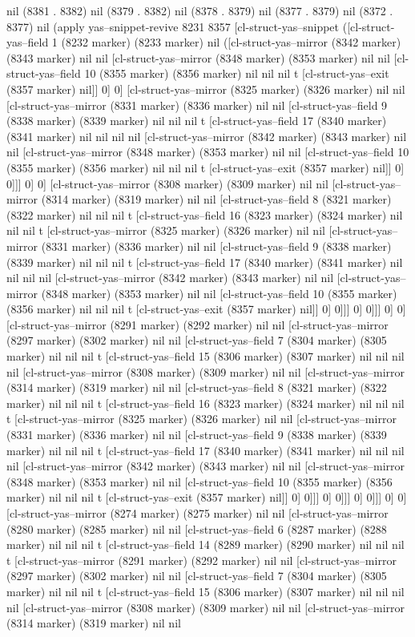 {{nil (8381 . 8382) nil (8379 . 8382) nil (8378 . 8379) nil (8377 . 8379) nil (8372 . 8377) nil (apply yas--snippet-revive 8231 8357 [cl-struct-yas--snippet ([cl-struct-yas--field 1 (8232 marker) (8233 marker) nil ([cl-struct-yas--mirror (8342 marker) (8343 marker) nil nil [cl-struct-yas--mirror (8348 marker) (8353 marker) nil nil [cl-struct-yas--field 10 (8355 marker) (8356 marker) nil nil nil t [cl-struct-yas--exit (8357 marker) nil]] 0] 0] [cl-struct-yas--mirror (8325 marker) (8326 marker) nil nil [cl-struct-yas--mirror (8331 marker) (8336 marker) nil nil [cl-struct-yas--field 9 (8338 marker) (8339 marker) nil nil nil t [cl-struct-yas--field 17 (8340 marker) (8341 marker) nil nil nil nil [cl-struct-yas--mirror (8342 marker) (8343 marker) nil nil [cl-struct-yas--mirror (8348 marker) (8353 marker) nil nil [cl-struct-yas--field 10 (8355 marker) (8356 marker) nil nil nil t [cl-struct-yas--exit (8357 marker) nil]] 0] 0]]] 0] 0] [cl-struct-yas--mirror (8308 marker) (8309 marker) nil nil [cl-struct-yas--mirror (8314 marker) (8319 marker) nil nil [cl-struct-yas--field 8 (8321 marker) (8322 marker) nil nil nil t [cl-struct-yas--field 16 (8323 marker) (8324 marker) nil nil nil t [cl-struct-yas--mirror (8325 marker) (8326 marker) nil nil [cl-struct-yas--mirror (8331 marker) (8336 marker) nil nil [cl-struct-yas--field 9 (8338 marker) (8339 marker) nil nil nil t [cl-struct-yas--field 17 (8340 marker) (8341 marker) nil nil nil nil [cl-struct-yas--mirror (8342 marker) (8343 marker) nil nil [cl-struct-yas--mirror (8348 marker) (8353 marker) nil nil [cl-struct-yas--field 10 (8355 marker) (8356 marker) nil nil nil t [cl-struct-yas--exit (8357 marker) nil]] 0] 0]]] 0] 0]]] 0] 0] [cl-struct-yas--mirror (8291 marker) (8292 marker) nil nil [cl-struct-yas--mirror (8297 marker) (8302 marker) nil nil [cl-struct-yas--field 7 (8304 marker) (8305 marker) nil nil nil t [cl-struct-yas--field 15 (8306 marker) (8307 marker) nil nil nil nil [cl-struct-yas--mirror (8308 marker) (8309 marker) nil nil [cl-struct-yas--mirror (8314 marker) (8319 marker) nil nil [cl-struct-yas--field 8 (8321 marker) (8322 marker) nil nil nil t [cl-struct-yas--field 16 (8323 marker) (8324 marker) nil nil nil t [cl-struct-yas--mirror (8325 marker) (8326 marker) nil nil [cl-struct-yas--mirror (8331 marker) (8336 marker) nil nil [cl-struct-yas--field 9 (8338 marker) (8339 marker) nil nil nil t [cl-struct-yas--field 17 (8340 marker) (8341 marker) nil nil nil nil [cl-struct-yas--mirror (8342 marker) (8343 marker) nil nil [cl-struct-yas--mirror (8348 marker) (8353 marker) nil nil [cl-struct-yas--field 10 (8355 marker) (8356 marker) nil nil nil t [cl-struct-yas--exit (8357 marker) nil]] 0] 0]]] 0] 0]]] 0] 0]]] 0] 0] [cl-struct-yas--mirror (8274 marker) (8275 marker) nil nil [cl-struct-yas--mirror (8280 marker) (8285 marker) nil nil [cl-struct-yas--field 6 (8287 marker) (8288 marker) nil nil nil t [cl-struct-yas--field 14 (8289 marker) (8290 marker) nil nil nil t [cl-struct-yas--mirror (8291 marker) (8292 marker) nil nil [cl-struct-yas--mirror (8297 marker) (8302 marker) nil nil [cl-struct-yas--field 7 (8304 marker) (8305 marker) nil nil nil t [cl-struct-yas--field 15 (8306 marker) (8307 marker) nil nil nil nil [cl-struct-yas--mirror (8308 marker) (8309 marker) nil nil [cl-struct-yas--mirror (8314 marker) (8319 marker) nil nil }}

